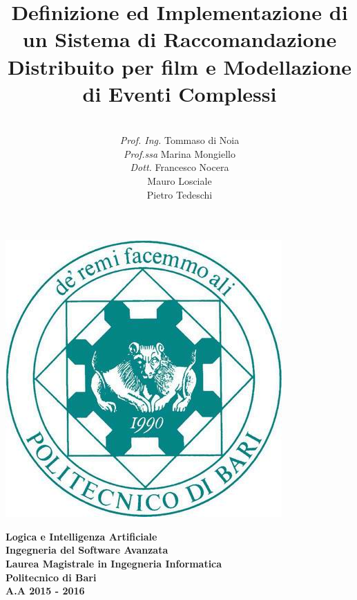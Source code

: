 \documentclass[12pt]{article}
\date{}
\begin{document}
\sloppy

\title{\textbf{Definizione ed Implementazione di un Sistema di Raccomandazione Distribuito per film
		e Modellazione di Eventi Complessi}}

\author{\\\textit{Prof. Ing.} Tommaso di Noia\\\textit{Prof.ssa} Marina Mongiello\\
	\textit{Dott.} Francesco Nocera\\
	Mauro Losciale\\ 
	Pietro Tedeschi\\}

\clearpage\maketitle
\thispagestyle{empty}

\begin{center}
	\includegraphics[scale=0.40]{images/poliba.jpg}
\end{center}

{\textbf{\center Logica e Intelligenza Artificiale\\Ingegneria del Software Avanzata\\ Laurea Magistrale in Ingegneria Informatica\\Politecnico di Bari\\A.A 2015 - 2016\\}}

\newpage
\clearpage
\thispagestyle{empty}
\renewcommand\contentsname{Indice}
\tableofcontents
\newpage
\setcounter{page}{1}
\end{document}
